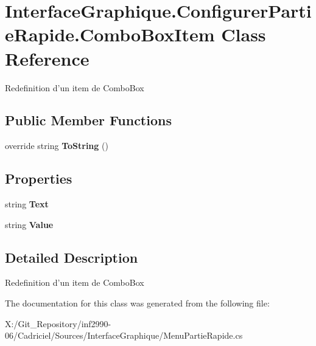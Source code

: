 \hypertarget{class_interface_graphique_1_1_configurer_partie_rapide_1_1_combo_box_item}{\section{Interface\-Graphique.\-Configurer\-Partie\-Rapide.\-Combo\-Box\-Item Class Reference}
\label{class_interface_graphique_1_1_configurer_partie_rapide_1_1_combo_box_item}
}


Redefinition d'un item de Combo\-Box  


\subsection*{Public Member Functions}
\begin{DoxyCompactItemize}
\item 
\hypertarget{class_interface_graphique_1_1_configurer_partie_rapide_1_1_combo_box_item_a4a2b0823abcb47c073d44ad318864a29}{override string {\bfseries To\-String} ()}\label{class_interface_graphique_1_1_configurer_partie_rapide_1_1_combo_box_item_a4a2b0823abcb47c073d44ad318864a29}

\end{DoxyCompactItemize}
\subsection*{Properties}
\begin{DoxyCompactItemize}
\item 
\hypertarget{class_interface_graphique_1_1_configurer_partie_rapide_1_1_combo_box_item_a49c8c93698b147b8cf0a7e4f7b20fc3e}{string {\bfseries Text}}\label{class_interface_graphique_1_1_configurer_partie_rapide_1_1_combo_box_item_a49c8c93698b147b8cf0a7e4f7b20fc3e}

\item 
\hypertarget{class_interface_graphique_1_1_configurer_partie_rapide_1_1_combo_box_item_abe3a9af3f056a3f9b78355ba4a352cda}{string {\bfseries Value}}\label{class_interface_graphique_1_1_configurer_partie_rapide_1_1_combo_box_item_abe3a9af3f056a3f9b78355ba4a352cda}

\end{DoxyCompactItemize}


\subsection{Detailed Description}
Redefinition d'un item de Combo\-Box 



The documentation for this class was generated from the following file\-:\begin{DoxyCompactItemize}
\item 
X\-:/\-Git\-\_\-\-Repository/inf2990-\/06/\-Cadriciel/\-Sources/\-Interface\-Graphique/Menu\-Partie\-Rapide.\-cs\end{DoxyCompactItemize}
